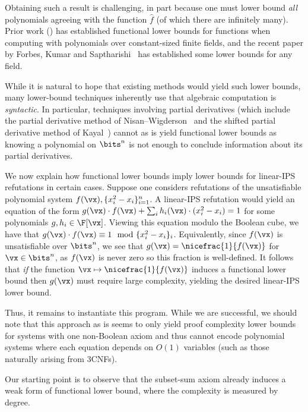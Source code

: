 \documentclass{toc}
\begin{document}
Obtaining such a result is challenging, in part because one must lower bound \emph{all} polynomials agreeing with the function $\hat{f}$ (of which there are infinitely many).  Prior work %
%
(\cite{GrigorievKarpinski98,GrigorievRazborov00,KumarSaptharishi15}) has established functional lower bounds for functions when computing with polynomials over constant-sized finite fields, and the recent %
paper by  %
Forbes, Kumar and Saptharishi~\cite{ForbesKS16} has established some lower bounds for any field.

While it is natural to hope that existing methods would yield such lower bounds, many %
lower-bound  %
techniques inherently use that algebraic computation is \emph{syntactic}.  In particular, techniques involving partial derivatives (which include the partial derivative method of Nisan--Wigderson~\cite{NisanWigderson96} and the shifted partial derivative method of Kayal~\cite{Kayal12,GuptaKKS14}) cannot as is yield functional lower bounds as
knowing a polynomial on $\bits^n$ is not enough  to conclude information about its partial derivatives.

We now explain how functional lower bounds imply lower bounds for linear-IPS refutations in certain cases.  Suppose one considers refutations of the unsatisfiable polynomial system $f(\vx),\{x_i^2-x_i\}_{i=1}^n$.  A linear-IPS refutation would yield an equation of the form $g(\vx)\cdot f(\vx)+\sum_i h_i(\vx)\cdot (x_i^2-x_i)=1$ for some polynomials $g,h_i\in\F[\vx]$.  Viewing this equation modulo the Boolean cube, we have that $g(\vx)\cdot f(\vx)\equiv 1\mod \{x_i^2-x_i\}_i$.  Equivalently, since $f(\vx)$ is unsatisfiable over $\bits^n$, we see that $g(\vx)=\nicefrac{1}{f(\vx)}$ for $\vx\in\bits^n$, as $f(\vx)$ is never zero so this fraction is well-defined.  It follows that \emph{if} the function $\vx\mapsto \nicefrac{1}{f(\vx)}$ induces a functional lower bound then $g(\vx)$ must require large complexity, yielding the desired linear-IPS lower bound.

Thus, it remains to instantiate this program.  While we are successful, we should note that this approach as is seems to only yield proof complexity lower bounds for systems with one non-Boolean axiom and thus cannot encode polynomial systems where each equation depends on $O(1)$ variables (such as those naturally arising from 3CNFs).

Our starting point is to observe that the subset-sum axiom already induces a weak form of functional lower bound, where the complexity is measured by degree.
\end{document}
